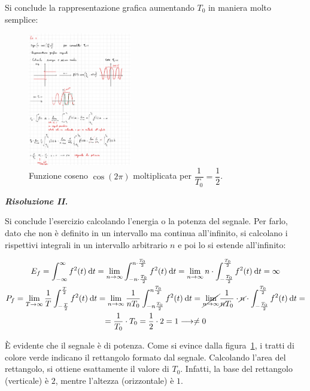 \documentclass[a4paper]{article}
\begin{document}
	\newpage

	\noindent
	Si conclude la rappresentazione grafica aumentando $T_0$ in maniera molto semplice:
	
	\begin{figure}[!htp]
		\centering
		\includegraphics[width=0.4\textwidth]{img/ex_exam/sng_func_2-Mod2.pdf}
		\caption{Funzione coseno $\cos\left(2\pi\right)$ moltiplicata per $\dfrac{1}{T_0}=\dfrac{1}{2}$.}\label{ex2_grafico}
	\end{figure}
	\noindent
	\textcolor{Green4}{\textbf{\emph{Risoluzione II.}}}
	
	\noindent
	Si conclude l'esercizio calcolando l'energia o la potenza del segnale. Per farlo, dato che non è definito in un intervallo ma continua all'infinito, si calcolano i rispettivi integrali in un intervallo arbitrario $n$ e poi lo si estende all'infinito:
	
	\begin{gather*}
		E_{f} = \int_{-\infty}^{\infty} f^{2}(t) \:\mathrm{d}t = \lim_{n\rightarrow\infty} \int_{-n\cdot\frac{T_0}{2}}^{n\cdot\frac{T_0}{2}} f^{2}(t) \:\mathrm{d}t = \lim_{n\rightarrow\infty} n\cdot\int_{-\frac{T_0}{2}}^{\frac{T_0}{2}} f^{2} (t) \:\mathrm{d}t = \infty \\
		P_{f} = \lim_{T\rightarrow\infty} \dfrac{1}{T} \int_{-\frac{T}{2}}^{\frac{T}{2}} f^{2}(t) \:\mathrm{d}t = \lim_{n\rightarrow\infty} \dfrac{1}{nT_{0}} \int_{-n\frac{T_{0}}{2}}^{n\frac{T_{0}}{2}} f^{2}(t)\:\mathrm{d}t = 
		\cancel{\lim_{n\rightarrow\infty}} \dfrac{1}{\cancel{n}T_{0}} \cdot \cancel{n} \cdot \int_{-\frac{T_{0}}{2}}^{\frac{T_{0}}{2}} f^{2}(t)\:\mathrm{d}t = \\
		= \dfrac{1}{T_{0}} \cdot T_{0} = \dfrac{1}{2} \cdot 2 = 1 \longrightarrow \ne 0
	\end{gather*}

	\noindent
	È evidente che il segnale è di potenza. Come si evince dalla figura~\ref{ex2_grafico}, i tratti di colore verde indicano il rettangolo formato dal segnale. Calcolando l'area del rettangolo, si ottiene esattamente il valore di $T_{0}$. Infatti, la base del rettangolo (verticale) è $2$, mentre l'altezza (orizzontale) è $1$.
	
\end{document}
